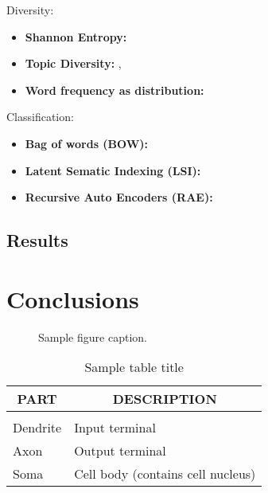 \documentclass{article} %
\begin{document}
Diversity:
\begin{itemize}
\item {\bf Shannon  Entropy:}
\item{\bf Topic Diversity:} \cite{ganguly-leveling-jones:2014:Coling}, \cite{Bache:2013:TMD:2487575.2487672}
\item{\bf Word frequency as distribution:}
\end{itemize}



Classification:
\begin{itemize}
\item {\bf Bag of words (BOW):}
\item{\bf Latent Sematic Indexing (LSI):}
\item{\bf Recursive Auto Encoders (RAE):}
\end{itemize}

\subsection{Results}
\label{sec:results}



\section{Conclusions}
\label{sec:conclusions}


\begin{figure}[h]
\begin{center}
\fbox{\rule[-.5cm]{0cm}{4cm} \rule[-.5cm]{4cm}{0cm}}
\end{center}
\caption{Sample figure caption.}
\end{figure}



\begin{table}[t]
\caption{Sample table title}
\label{sample-table}
\begin{center}
\begin{tabular}{ll}
\multicolumn{1}{c}{\bf PART}  &\multicolumn{1}{c}{\bf DESCRIPTION}
\\ \hline \\
Dendrite         &Input terminal \\
Axon             &Output terminal \\
Soma             &Cell body (contains cell nucleus) \\
\end{tabular}
\end{center}
\end{table}




\end{document}
